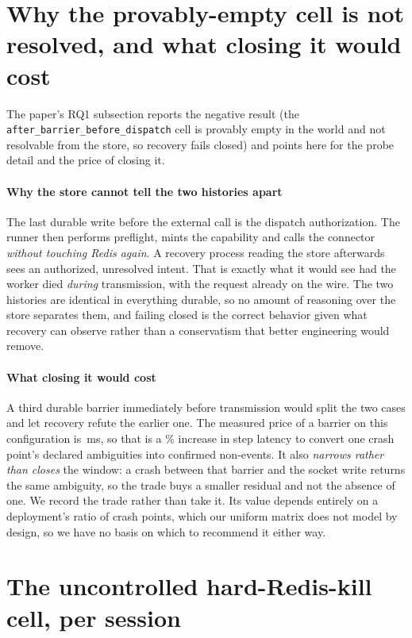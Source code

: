 \documentclass[10pt,journal,compsoc]{IEEEtran}
\begin{document}
\section{Why the provably-empty cell is not resolved, and what closing it would
cost}
\label{supp:provable}

The paper's RQ1 subsection reports the negative result (the
\texttt{after\_barrier\_before\_dispatch} cell is provably empty in the world
and not resolvable from the store, so recovery fails closed) and points here
for the probe detail and the price of closing it.

\paragraph{Why the store cannot tell the two histories apart} The last durable
write before the external call is the dispatch authorization. The runner then
performs preflight, mints the capability and calls the connector \emph{without
touching Redis again}. A recovery process reading the store afterwards sees an
authorized, unresolved intent. That is exactly what it would see had the
worker died \emph{during} transmission, with the request already on the wire.
The two histories are identical in everything durable, so no amount of reasoning
over the store separates them, and failing closed is the correct behavior given
what recovery can observe rather than a conservatism that better engineering
would remove.

\paragraph{What closing it would cost} A third durable barrier immediately
before transmission would split the two cases and let recovery refute the
earlier one. The measured price of a barrier on this configuration is
\BarrierCostEach{}\,ms, so that is a \ThirdBarrierStepPct{}\% increase in step
latency to convert one crash point's declared ambiguities into confirmed
non-events. It also \emph{narrows rather than closes} the window: a crash
between that barrier and the socket write returns the same ambiguity, so the
trade buys a smaller residual and not the absence of one. We record the trade
rather than take it. Its value depends entirely on a deployment's ratio of crash
points, which our uniform matrix does not model by design, so we have no
basis on which to recommend it either way.

\section{The uncontrolled hard-Redis-kill cell, per session}
\label{supp:uncontrolled}
\end{document}
